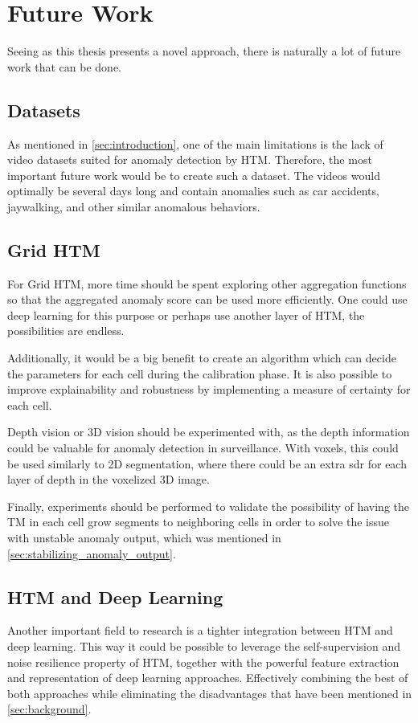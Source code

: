 \section{Future Work}
\label{sec:future_work}
Seeing as this thesis presents a novel approach, there is naturally a lot of future work that can be done.
\subsection*{Datasets}
As mentioned in \autoref{sec:introduction}, one of the main limitations is the lack of video datasets suited for anomaly detection by HTM. Therefore, the most important future work would be to create such a dataset. The videos would optimally be several days long and contain anomalies such as car accidents, jaywalking, and other similar anomalous behaviors.
\par
\subsection*{Grid HTM}
For Grid HTM, more time should be spent exploring other aggregation functions so that the aggregated anomaly score can be used more efficiently. One could use deep learning for this purpose or perhaps use another layer of HTM, the possibilities are endless.
\par
Additionally, it would be a big benefit to create an algorithm which can decide the parameters for each cell during the calibration phase. It is also possible to improve explainability and robustness by implementing a measure of certainty for each cell.
\par
Depth vision or 3D vision should be experimented with, as the depth information could be valuable for anomaly detection in surveillance. With voxels, this could be used similarly to 2D segmentation, where there could be an extra \gls*{sdr} for each layer of depth in the voxelized 3D image.
\par
Finally, experiments should be performed to validate the possibility of having the TM in each cell grow segments to neighboring cells in order to solve the issue with unstable anomaly output, which was mentioned in \autoref{sec:stabilizing_anomaly_output}.
\subsection*{HTM and Deep Learning}
Another important field to research is a tighter integration between HTM and deep learning. This way it could be possible to leverage the self-supervision and noise resilience property of HTM, together with the powerful feature extraction and representation of deep learning approaches. Effectively combining the best of both approaches while eliminating the disadvantages that have been mentioned in \autoref{sec:background}.
\par
